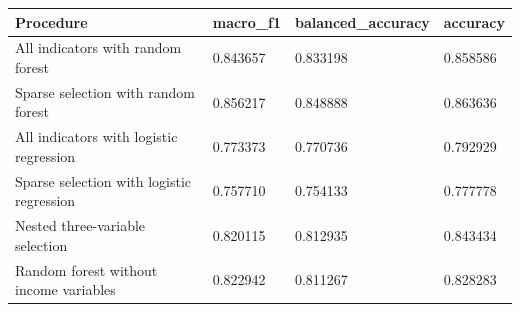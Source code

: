 \begin{tabular}{llll}
\hline
Procedure & macro\_f1 & balanced\_accuracy & accuracy \\
\hline
All indicators with random forest & 0.843657 & 0.833198 & 0.858586 \\
Sparse selection with random forest & 0.856217 & 0.848888 & 0.863636 \\
All indicators with logistic regression & 0.773373 & 0.770736 & 0.792929 \\
Sparse selection with logistic regression & 0.757710 & 0.754133 & 0.777778 \\
Nested three-variable selection & 0.820115 & 0.812935 & 0.843434 \\
Random forest without income variables & 0.822942 & 0.811267 & 0.828283 \\
\hline
\end{tabular}
